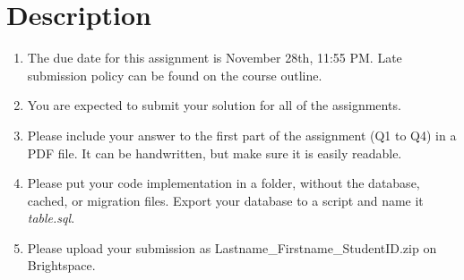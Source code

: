 \documentclass{homework}
\begin{document}
\section*{Description}
\begin{enumerate}
    \item The due date for this assignment is November 28th, 11:55 PM. Late submission policy can be found on the course outline.
    \item You are expected to submit your solution for all of the assignments.
    \item Please include your answer to the first part of the assignment (Q1 to Q4) in a PDF file. It can be handwritten, but make sure it is easily readable.
    \item Please put your code implementation in a folder, without the database, cached, or migration files. Export your database to a script and name it \textit{table.sql}.
    \item Please upload your submission as Lastname\_Firstname\_StudentID.zip on Brightspace.
\end{enumerate}
\end{document}
